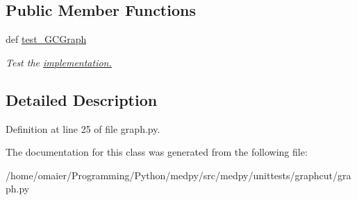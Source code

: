 \subsection*{Public Member Functions}
\begin{DoxyCompactItemize}
\item 
\hypertarget{classmedpy_1_1unittests_1_1graphcut_1_1graph_1_1TestGraph_a864794e42d7d060e1700678bc7285a31}{
def \hyperlink{classmedpy_1_1unittests_1_1graphcut_1_1graph_1_1TestGraph_a864794e42d7d060e1700678bc7285a31}{test\_\-GCGraph}}
\label{classmedpy_1_1unittests_1_1graphcut_1_1graph_1_1TestGraph_a864794e42d7d060e1700678bc7285a31}

\begin{DoxyCompactList}\small\item\em Test the \hyperlink{classmedpy_1_1graphcut_1_1graph_1_1GCGraph}{implementation. }\end{DoxyCompactList}\end{DoxyCompactItemize}


\subsection{Detailed Description}


Definition at line 25 of file graph.py.



The documentation for this class was generated from the following file:\begin{DoxyCompactItemize}
\item 
/home/omaier/Programming/Python/medpy/src/medpy/unittests/graphcut/graph.py\end{DoxyCompactItemize}
